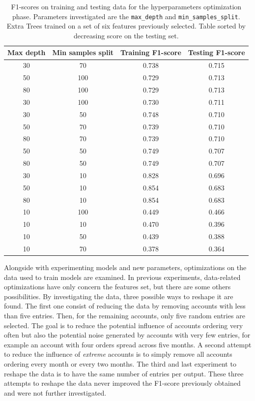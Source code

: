 \begin{table}[htbp]
    \centering
    \begin{tabular}{c|c|c|c}
    \textbf{Max depth} & \textbf{Min samples split} & \textbf{Training F1-score} & \textbf{Testing F1-score} \\ \hline
    30	&  70   &  	0.738  &  0.715 \\
    50	&  100  &  	0.729  &  0.713 \\
    80	&  100  &  	0.729  &  0.713 \\
    30	&  100  &  	0.730  &  0.711 \\
    30	&  50   &  	0.748  &  0.710 \\
    50	&  70   &  	0.739  &  0.710 \\
    80	&  70   &  	0.739  &  0.710 \\
    50	&  50   &  	0.749  &  0.707 \\
    80	&  50   &  	0.749  &  0.707 \\
    30	&  10   &  	0.828  &  0.696 \\
    50	&  10   &  	0.854  &  0.683 \\
    80	&  10   &  	0.854  &  0.683 \\
    10	&  100  &  	0.449  &  0.466 \\
    10	&  10   &  	0.470  &  0.396 \\
    10	&  50   &  	0.439  &  0.388 \\
    10	&  70   &  	0.378  &  0.364 
    \end{tabular}
    \caption[F1-scores for ExtraTree hyperparameters optimization]{F1-scores on training and testing data for the hyperparameters optimization phase. Parameters investigated are the \texttt{max\_depth} and \texttt{min\_samples\_split}. Extra Trees trained on a set of six features previously selected. Table sorted by decreasing score on the testing set.}
    \label{tab:tree-fine-tune}
\end{table}

Alongside with experimenting models and new parameters, optimizations on the data used to train models are examined. In previous experiments, data-related optimizations have only concern the features set, but there are some others possibilities. By investigating the data, three possible ways to reshape it are found. 
The first one consist of reducing the data by removing accounts with less than five entries. Then, for the remaining accounts, only five random entries are selected. The goal is to reduce the potential influence of accounts ordering very often but also the potential noise generated by accounts with very few entries, for example an account with four orders spread across five months. A second attempt to reduce the influence of \textit{extreme} accounts is to simply remove all accounts ordering every month or every two months. The third and last experiment to reshape the data is to have the same number of entries per output. These three attempts to reshape the data never improved the F1-score previously obtained and were not further investigated.


